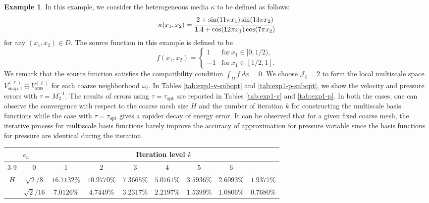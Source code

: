 \documentclass{article}[11pt]
\theoremstyle{definition}
\newtheorem{exmp}{Example}[section]
\newcommand{\norm}[1]{\left\|#1\right\|}
\begin{document}
\begin{exmp} \label{exp1}
In this example, we consider the heterogeneous media $\kappa$ to be defined as follows: 
$$\kappa (x_1, x_2) =\cfrac{2+\sin(11\pi x_1)\sin(13\pi x_2)}{1.4+\cos(12\pi x_1)\cos(7\pi x_2)}$$
for any $(x_1, x_2) \in D$. The source function in this example is defined to be 
$$ f(x_1, x_2) = \left \{ \begin{array}{cl}
1 & \text{for} ~ x_1 \in [0, 1/2),\\
-1 & \text{for} ~x_1 \in [1/2, 1].
\end{array} \right . $$
We remark that the source function satisfies the compatibility condition $\int_D f ~dx= 0$. 
We choose $\mathcal{J}_{\ell} = 2$ to form the local multiscale space $V_{\text{snap},1}^{(\ell)} \oplus V_{\text{sms}}^{(\ell)}$ for each coarse neighborhood $\omega_{\ell}$. 
In Tables \ref{tab:exp1-v-subopt} and \ref{tab:exp1-p-subopt}, we show the velocity and pressure errors with $\tau = M_2^{-1}$.
The results of errors using $\tau = \tau_{\text{opt}}$ are reported in Tables \ref{tab:exp1-v} and \ref{tab:exp1-p}. 
In both the cases, one can observe the convergence with respect to the coarse mesh size $H$ and the number of iteration $k$ for constructing the multiscale basis functions while the case with $\tau = \tau_{\text{opt}}$ gives a rapider decay of energy error. It can be observed that for a given fixed coarse mesh, the iterative process for multiscale basis functions barely improve the accuracy of approximation for pressure variable since the basis functions for pressure are identical during the iteration. 

\begin{table}[ht]
\centering
\begin{tabular}{cc||ccccccc}
\hline
\multicolumn{2}{c||}{\multirow{2}{*}{$e_a$}}   & \multicolumn{7}{c}{Iteration level $k$}           \\ \cline{3-9} 
\multicolumn{2}{c||}{} &   $0$ & $1$   & $2$   & $3$   & $4$   &$5$ & $6$ \\ 
\hline \hline
\multicolumn{1}{c|}{\multirow{3}{*}{$H$}} & 
$\sqrt{2}/8$ & $16.7132\%$ & $10.9770\%$ & $7.3665\%$ & $5.0761\%$ & $3.5936\%$ & $2.6093\%$ & $1.9377\%$ \\

\multicolumn{1}{c|}{} &  
$\sqrt{2}/16$ & $7.0126\%$ & $4.7449\%$ & $3.2317\%$ & $2.2197\%$ & $1.5399\%$ & $1.0806\%$ & $0.7680\%$ \\



\end{tabular}
\end{table}
\end{exmp}
\end{document}
